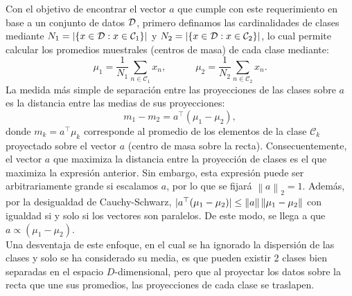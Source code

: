 Con el objetivo de encontrar el vector $a$ que cumple con este requerimiento en base a un conjunto de datos  ${\mathcal D}$, primero definamos las cardinalidades de clases mediante $N_1 = |\{x\in{\mathcal D}:x\in{\mathcal C}_1\}|$ y $N_2 = |\{x\in{\mathcal D}:x\in{\mathcal C}_2\}|$, lo cual permite calcular los promedios muestrales (centros de masa) de cada  clase mediante: 
\begin{equation}
	\mu_1=\frac{1}{N_1}\sum_{n\in\mathcal{C}_1}x_n,
	\quad\quad\quad
	\mu_2=\frac{1}{N_2}\sum_{n\in\mathcal{C}_2}x_n.
\end{equation}
La medida más simple de separación entre las proyecciones de las clases sobre $a$ es la distancia entre las medias  de sus proyecciones:
\begin{equation}
	m_1 - m_2 = a^\top(\mu_1-\mu_2),
\end{equation}
donde $m_k= a^\top\mu_k$ corresponde al promedio de los elementos de  la clase $\mathcal{C}_k$ proyectado sobre el  vector $a$ (centro de masa sobre la recta). Consecuentemente, el vector $a$ que maximiza la distancia entre la proyección de clases es el que maximiza la expresión anterior. Sin embargo, esta expresión puede ser arbitrariamente grande si escalamos $a$, por lo que se fijará $\left \| a \right \|_2=1$. Además, por la desigualdad de Cauchy-Schwarz, $|a^\top(\mu_1-\mu_2)|\leq \left\lVert a\right\rVert\left\lVert\mu_1-\mu_2\right\rVert$ con igualdad si y solo si los vectores son paralelos. De este modo, se llega a que $a\propto(\mu_1-\mu_2)$. \\

Una desventaja de este enfoque, en el cual se ha ignorado la dispersión de las clases y solo se ha considerado su media, es que pueden existir 2 clases bien separadas en el espacio $D$-dimensional, pero que al proyectar los datos sobre la recta que une sus promedios, las proyecciones de cada clase se traslapen. 

